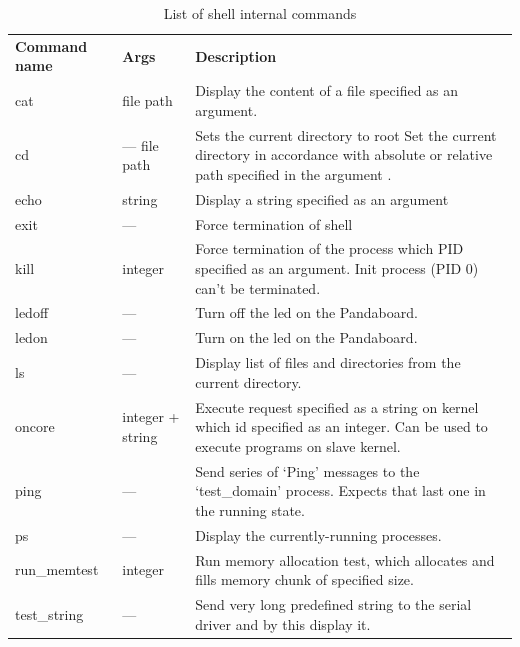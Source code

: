 \documentclass[a4paper,10pt]{article}
\begin{document}
	\begin{table}[h]
       		\centering
        	\begin{tabular}{| m{2.0cm} | m{1.5cm} | m{7.0cm} |}
			\hhline{===}
            		\textbf{Command name} 	& \textbf{Args} 	& \textbf{Description}	\\
			\hhline{===}
            		cat 				& file path 							& Display the content of a file specified as an argument. 																\\ \hline
            		cd 				& --- \newline file path \newline \newline	& Sets the current directory to root \newline	Set the current directory in accordance with absolute or relative path specified in the argument	.	\\ \hline
            		echo 				& string 							& Display a string specified as an argument																			\\ \hline
            		exit 				& --- 							& Force termination of shell																						\\ \hline
            		kill 				& integer 							& Force termination of the process which PID specified as an argument. Init process (PID 0) can't be terminated.						\\ \hline
            		ledoff			& ---								& Turn off the led on the Pandaboard.																				\\ \hline
            		ledon				& --- 							& Turn on the led on the Pandaboard.																				\\ \hline
            		ls 				& --- 							& Display list of files and directories from the current directory.															\\ \hline
            		oncore			& integer + string 					& Execute request specified as a string on kernel which id specified as an integer. Can be used to execute programs on slave kernel.			\\ \hline
            		ping 				& --- 							& Send series of `Ping' messages to the `test\_domain' process. Expects that last one in the running state.							\\ \hline
            		ps 				& --- 							& Display the currently-running processes.																			\\ \hline
            		run\_memtest		& integer 							& Run memory allocation test, which allocates and fills memory chunk of specified size. 											\\ \hline
            		test\_string		& --- 							& Send very long predefined string to the serial driver and by this display it.													\\ \hline            		
        	\end{tabular}
        	\caption{List of shell internal commands}
        	\label{tbl:icl}
	\end{table}
	
\end{document}
